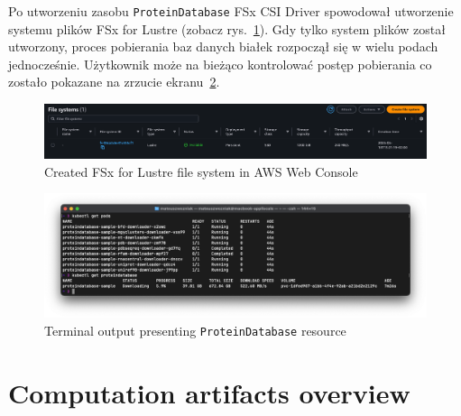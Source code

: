 Po utworzeniu zasobu \texttt{ProteinDatabase} FSx CSI Driver spowodował utworzenie systemu plików FSx for Lustre (zobacz rys.~\ref{fig:fsx_fs}).
Gdy tylko system plików został utworzony, proces pobierania baz danych białek rozpoczął się w wielu podach jednocześnie.
Użytkownik może na bieżąco kontrolować postęp pobierania co zostało pokazane na zrzucie ekranu~\ref{fig:used_proteindatabase_terminal}.

\begin{figure}[htbp]
  \centering
  \includegraphics[width=\textwidth]{images/fsx_fs}
  \caption{Created FSx for Lustre file system in AWS Web Console}
  \label{fig:fsx_fs}
\end{figure}

\begin{figure}[htbp]
  \centering
  \includegraphics[width=\textwidth]{images/old_proteindatabase_terminal}
  \caption{Terminal output presenting \texttt{ProteinDatabase} resource}
  \label{fig:used_proteindatabase_terminal}
\end{figure}

\section{Computation artifacts overview}